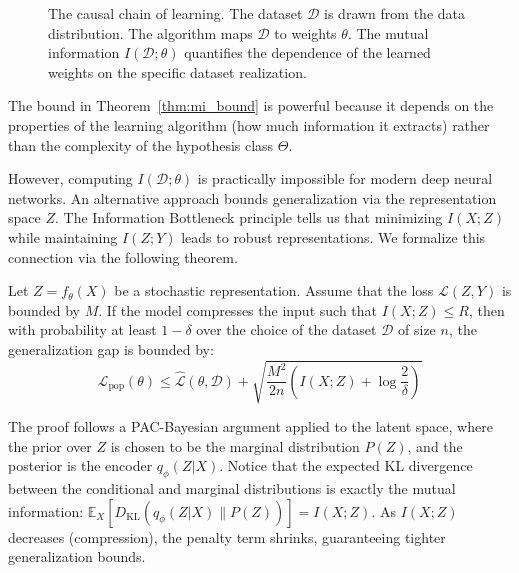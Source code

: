 \begin{figure}[htbp]
\centering
{}
\caption{The causal chain of learning. The dataset $\mathcal{D}$ is drawn from the data distribution. The algorithm maps $\mathcal{D}$ to weights $\theta$. The mutual information $I(\mathcal{D}; \theta)$ quantifies the dependence of the learned weights on the specific dataset realization.}
\label{fig:mi_chain}
\end{figure}

The bound in Theorem~\ref{thm:mi_bound} is powerful because it depends on the properties of the learning algorithm (how much information it extracts) rather than the complexity of the hypothesis class $\Theta$. 

However, computing $I(\mathcal{D}; \theta)$ is practically impossible for modern deep neural networks. An alternative approach bounds generalization via the representation space $Z$. The Information Bottleneck principle tells us that minimizing $I(X; Z)$ while maintaining $I(Z; Y)$ leads to robust representations. We formalize this connection via the following theorem.

\begin{theorem} \label{thm:rep_bound}
Let $Z = f_\theta(X)$ be a stochastic representation. Assume that the loss $\mathcal{L}(Z, Y)$ is bounded by $M$. If the model compresses the input such that $I(X; Z) \leq R$, then with probability at least $1 - \delta$ over the choice of the dataset $\mathcal{D}$ of size $n$, the generalization gap is bounded by:
\[ \mathcal{L}_{\text{pop}}(\theta) \leq \hat{\mathcal{L}}(\theta, \mathcal{D}) + \sqrt{\frac{M^2}{2n} \left( I(X; Z) + \log \frac{2}{\delta} \right)} \]
\end{theorem}
The proof follows a PAC-Bayesian argument applied to the latent space, where the prior over $Z$ is chosen to be the marginal distribution $P(Z)$, and the posterior is the encoder $q_\phi(Z|X)$. Notice that the expected KL divergence between the conditional and marginal distributions is exactly the mutual information: $\mathbb{E}_X[D_{\text{KL}}(q_\phi(Z|X) \parallel P(Z))] = I(X; Z)$. As $I(X; Z)$ decreases (compression), the penalty term shrinks, guaranteeing tighter generalization bounds.


